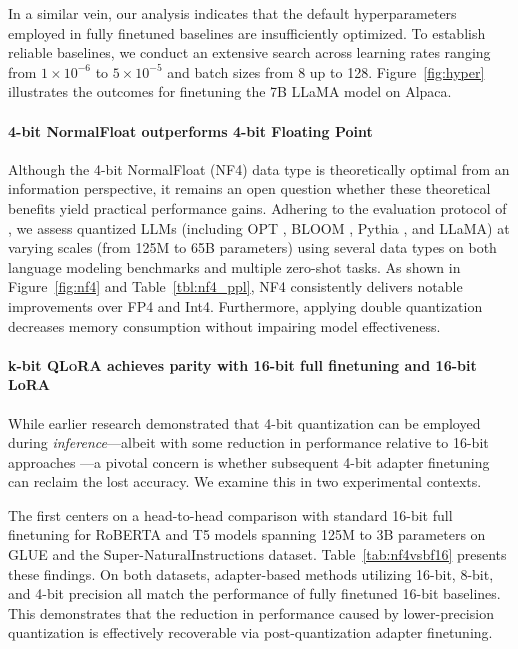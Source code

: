 In a similar vein, our analysis indicates that the default hyperparameters employed in fully finetuned baselines are insufficiently optimized. To establish reliable baselines, we conduct an extensive search across learning rates ranging from $1\times10^{-6}$ to $5\times10^{-5}$ and batch sizes from 8 up to 128. Figure~\ref{fig:hyper} illustrates the outcomes for finetuning the 7B LLaMA model on Alpaca.

\paragraph{4-bit NormalFloat outperforms 4-bit Floating Point}

Although the 4-bit NormalFloat (NF4) data type is theoretically optimal from an information perspective, it remains an open question whether these theoretical benefits yield practical performance gains. Adhering to the evaluation protocol of \citet{dettmers2022case}, we assess quantized LLMs (including OPT \citep{zhang2022opt}, BLOOM \cite{scao2022bloom}, Pythia \cite{biderman2023pythia}, and LLaMA) at varying scales (from 125M to 65B parameters) using several data types on both language modeling benchmarks and multiple zero-shot tasks. As shown in Figure~\ref{fig:nf4} and Table~\ref{tbl:nf4_ppl}, NF4 consistently delivers notable improvements over FP4 and Int4. Furthermore, applying double quantization decreases memory consumption without impairing model effectiveness.

\paragraph{k-bit \textsc{QLoRA} achieves parity with 16-bit full finetuning and 16-bit LoRA}

While earlier research demonstrated that 4-bit quantization can be employed during \emph{inference}—albeit with some reduction in performance relative to 16-bit approaches \citep{dettmers2022case,frantar2022gptq}—a pivotal concern is whether subsequent 4-bit adapter finetuning can reclaim the lost accuracy. We examine this in two experimental contexts.

The first centers on a head-to-head comparison with standard 16-bit full finetuning for RoBERTA and T5 models spanning 125M to 3B parameters on GLUE and the Super-NaturalInstructions dataset. Table~\ref{tab:nf4vsbf16} presents these findings. On both datasets, adapter-based methods utilizing 16-bit, 8-bit, and 4-bit precision all match the performance of fully finetuned 16-bit baselines. This demonstrates that the reduction in performance caused by lower-precision quantization is effectively recoverable via post-quantization adapter finetuning.

